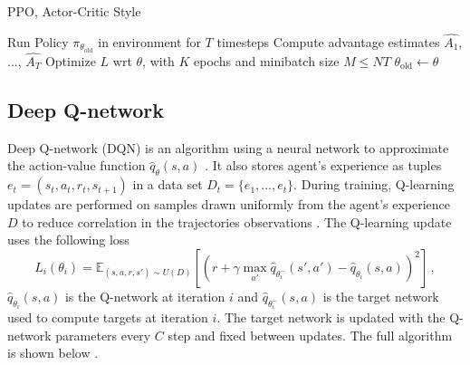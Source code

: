 \begin{algorithm}
	\caption{PPO, Actor-Critic Style}\label{algorithm:ppo}
	\begin{algorithmic}
			\State Run Policy $\pi_{\theta_\text{old}}$ in environment for $T$ timesteps
			\State Compute advantage estimates $\hat{A_1}$, ..., $\hat{A_T}$
		\EndFor
		\State Optimize $L$ wrt $\theta$, with $K$ epochs and minibatch size $M \leq NT$
		\State $\theta_{\text{old}} \gets \theta$
	\EndFor
\end{algorithmic}
\end{algorithm}

\subsection{Deep Q-network}

Deep Q-network (DQN) is an algorithm using a neural network to approximate the action-value function $\hat{q}_\theta(s, a)$ \cite{mnih2015human}. It also stores agent's experience as tuples $e_t = (s_t, a_t, r_t, s_{t+1})$ in a data set $D_t = \{e_1, ..., e_t\}$. During training, Q-learning updates are performed on samples drawn uniformly from the agent's experience $D$ to reduce correlation in the trajectories observations \cite{mnih2015human}. The Q-learning update uses the following loss \cite{mnih2015human}
\begin{equation} \label{equation:2.16}
	L_i(\theta_i) = \mathbb{E}_{(s,a,r,s') \sim U(D)} \left [\left ( r + \gamma \max_{a'}\hat{q}_{\theta^-_i}(s',a') -\hat{q}_{\theta_i}(s,a) \right )^2 \right ] \, ,
\end{equation}
$\hat{q}_{\theta_i}(s,a)$ is the Q-network at iteration $i$ and $\hat{q}_{\theta^-_i}(s,a)$ is the target network used to compute targets at iteration $i$. The target network is updated with the Q-network parameters every $C$ step and fixed between updates. The full algorithm is shown below \cite{mnih2015human}.

